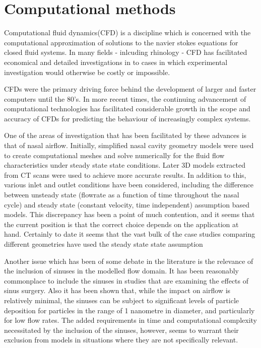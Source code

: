 \section{Computational methods}  
Computational fluid dynamics(CFD) is a discipline which is concerned with the computational approximation of solutions to the navier stokes equations for closed fluid systems\cite{Tu2008}. In many fields - inlcuding rhinology - CFD has facilitated economical and detailed investigations in to cases in which experimental investigation would otherwise be costly or impossible\cite{Keyhani1995}.

CFDs were the primary driving force behind the development of larger and faster computers until the 80's\cite{Wendt2009}. In more recent times, the continuing advancement of computational technologies has facilitated considerable growth in the scope and accuracy of CFDs for predicting the behaviour of increasingly complex systems\cite{Tu2008}. 

One of the areas of investigation that has been facilitated by these advances is that of nasal airflow. Initially, simplified nasal cavity geometry models were used to create computational meshes and solve numerically for the fluid flow characteristics under steady state state conditions\cite{Keyhani1995, Hahn1993}. Later 3D models extracted from CT scans were used to achieve more accurate results\cite{Martonen2002}. In addition to this, various inlet and outlet conditions have been considered, including the difference between unsteady state  (flowrate as a function of time throughout the nasal cycle)\cite{Shi2006} and steady state (constant velocity, time independent) assumption based models\cite{Wen2008}. This discrepancy has been a point of much contention, and it seems that the current position is that the correct choice depends on the application at hand\cite{Doorly2008c}. Certainly to date it seems that the vast bulk of the case studies comparing different geometries have used the steady state state assumption\cite{Xi2012, Zhu2011, Garcia2007}

Another issue which has been of some debate in the literature is the relevance of the inclusion of sinuses in the modelled flow domain. It has been reasonably commonplace to include the sinuses in studies that are examining the effects of sinus surgery\cite{Xiong2008a, Lindemann2005}. Also it has been shown that, while the impact on airflow is relatively minimal, the sinuses can be subject to significant levels of particle deposition for particles in the range of 1 nanometre in diameter, and particularly for low flow rates\cite{Ge2012}. The added requirements in time and computational complexity necessitated by the inclusion of the sinuses, however, seems to warrant their exclusion from models in situations where they are not specifically relevant\cite{Doorly2008c}.

